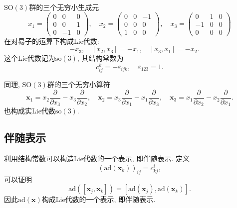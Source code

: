 \documentclass[UTF8]{ctexart}
\begin{document}
$\mathrm{SO}(3)$群的三个无穷小生成元
\begin{equation}
  x_1 =
  \begin{pmatrix}
    0 & 0 & 0 \\
    0 & 0 & 1 \\
    0 & -1 & 0
  \end{pmatrix}, \quad x_2 =
  \begin{pmatrix}
    0 & 0 & -1 \\
    0 & 0 & 0 \\
    1 & 0 & 0
  \end{pmatrix}, \quad x_3 =
  \begin{pmatrix}
    0 & 1 & 0 \\
    -1 & 0 & 0 \\
    0 & 0 & 0
  \end{pmatrix}
\end{equation}
在对易子的运算下构成Lie代数:
\begin{equation}
  [x_1,x_2] = - x_3, \quad [x_2,x_3] = - x_1, \quad [x_3,x_1] = -x_2.
\end{equation}
这个Lie代数记为$\mathrm{so}(3)$, 其结构常数为
\begin{equation}
  c_{ij}^k = - \varepsilon_{ijk}, \quad \varepsilon_{123} = 1.
\end{equation}

同理, $\mathrm{SO}(3)$群的三个无穷小算符
\begin{equation}
  \bm{x}_1 = x_2 \frac{\partial}{\partial x_3} - x_3 \frac{\partial}{\partial x_2}, \quad \bm{x}_2 = x_3 \frac{\partial}{\partial x_1} - x_1 \frac{\partial}{\partial x_3}, \quad \bm{x}_3 = x_1 \frac{\partial}{\partial x_2} - x_2 \frac{\partial}{\partial x_1}.
\end{equation}
也构成实Lie代数$\mathrm{so}(3)$.

\subsection{伴随表示}
利用结构常数可以构造Lie代数的一个表示, 即伴随表示. 定义
\begin{equation}
  (\mathrm{ad}(\bm{x}_k))_{ij} = c_{kj}^i,
\end{equation}
可以证明
\begin{equation}
  \mathrm{ad}([\bm{x}_j,\bm{x}_k]) = [\mathrm{ad}(\bm{x}_j), \mathrm{ad}(\bm{x}_k)].
\end{equation}
因此$\mathrm{ad}(\bm{x})$构成Lie代数的一个表示, 即伴随表示.
\end{document}
